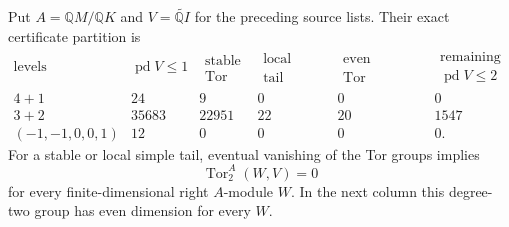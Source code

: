 \begin{proposition}
\label{C:five-row-six-outside-row-reduction}
Put $A=\mathbb QM/\mathbb QK$ and
$V=\widetilde{\mathbb QI}$ for the preceding source lists.
Their exact certificate partition is
\[
\begin{array}{c|r|r|r|r|r}
\text{levels}&\operatorname{pd}V\leq1&\substack{\text{stable}\\\text{Tor}}&
 \substack{\text{local simple}\\\text{tail}}&\substack{\text{even degree-two}\\\text{Tor}}&
 \substack{\text{remaining}\\\operatorname{pd}V\leq2}\\\hline
4+1&24&9&0&0&0\\
3+2&35683&22951&22&20&1547\\
(-1,-1,0,0,1)&12&0&0&0&0.
\end{array}
\]
For a stable or local simple tail, eventual vanishing of the Tor
groups implies
\[
 \operatorname{Tor}_2^A(W,V)=0
\]
for every finite-dimensional right $A$-module $W$.
In the next column this degree-two group has even dimension for every $W$.
\end{proposition}
